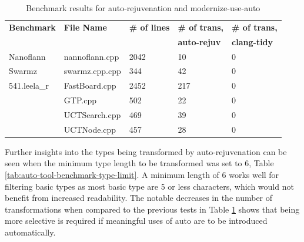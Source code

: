\documentclass[bsc,frontabs,singlespacing,parskip,deptreport]{infthesis}
\begin{document}

\begin{table}[H]
    \begin{center}
        \begin{tabular}{| l | l | l | l | l |}
            \hline
            \textbf{Benchmark}    & \textbf{File Name}    & \textbf{\# of lines}  & \textbf{\# of trans,} & \textbf{\# of trans,} \\ 
                                  &                       &                       & \textbf{auto-rejuv}   & \textbf{clang-tidy}   \\ \hline
            Nanoflann    & nannoflann.cpp   & 2042  & 10  & 0\\ \hline
            Swarmz       & swarmz.cpp.cpp   & 344   & 42  & 0\\ \hline
            541.leela\_r & FastBoard.cpp    & 2452	& 217 & 0\\ \hline
                         & GTP.cpp          & 502	& 22  & 0\\ \hline
                         & UCTSearch.cpp    & 469   & 39  & 0\\ \hline
                         & UCTNode.cpp	    & 457   & 28  & 0\\ \hline
        \end{tabular}
        \caption{Benchmark results for auto-rejuvenation and modernize-use-auto}
        \label{tab:auto-tool-benchmark-res}
    \end{center}
\end{table}

Further insights into the types being transformed by auto-rejuvenation can be seen when the minimum type length to be transformed was set to 6, Table \ref{tab:auto-tool-benchmark-type-limit}. A minimum length of 6 works well for filtering basic types as most basic type are 5 or less characters, which would not benefit from increased readability. The notable decreases in the number of transformations when compared to the previous tests in Table \ref{tab:auto-tool-benchmark-res} shows that being more selective is required if meaningful uses of auto are to be introduced automatically.

\end{document}
